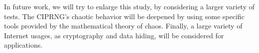 \documentclass[10pt, conference, compsocconf]{IEEEtran}
\begin{document}
In future work, we will try to enlarge this study, by considering a larger variety of tests.
The CIPRNG's chaotic behavior will be deepened by using some specific tools provided by the mathematical theory of chaos.
Finally, a large variety of Internet usages, as cryptography and data hiding, will be considered for applications.





%
%
%







\end{document}
